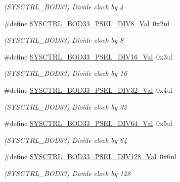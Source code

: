 \begin{DoxyCompactItemize}
\begin{DoxyCompactList}\small\item\em (S\+Y\+S\+C\+T\+R\+L\+\_\+\+B\+O\+D33) Divide clock by 4 \end{DoxyCompactList}\item 
\#define \mbox{\hyperlink{group___s_a_m_d21___s_y_s_c_t_r_l_gaa1ad5b1483db3f43c7c342ea50967e37}{S\+Y\+S\+C\+T\+R\+L\+\_\+\+B\+O\+D33\+\_\+\+P\+S\+E\+L\+\_\+\+D\+I\+V8\+\_\+\+Val}}~0x2ul
\begin{DoxyCompactList}\small\item\em (S\+Y\+S\+C\+T\+R\+L\+\_\+\+B\+O\+D33) Divide clock by 8 \end{DoxyCompactList}\item 
\#define \mbox{\hyperlink{group___s_a_m_d21___s_y_s_c_t_r_l_ga0711ef0d5c885afcd4cce3fd7d293f1e}{S\+Y\+S\+C\+T\+R\+L\+\_\+\+B\+O\+D33\+\_\+\+P\+S\+E\+L\+\_\+\+D\+I\+V16\+\_\+\+Val}}~0x3ul
\begin{DoxyCompactList}\small\item\em (S\+Y\+S\+C\+T\+R\+L\+\_\+\+B\+O\+D33) Divide clock by 16 \end{DoxyCompactList}\item 
\#define \mbox{\hyperlink{group___s_a_m_d21___s_y_s_c_t_r_l_ga701104d5ed696bb56d1e85da44ccce69}{S\+Y\+S\+C\+T\+R\+L\+\_\+\+B\+O\+D33\+\_\+\+P\+S\+E\+L\+\_\+\+D\+I\+V32\+\_\+\+Val}}~0x4ul
\begin{DoxyCompactList}\small\item\em (S\+Y\+S\+C\+T\+R\+L\+\_\+\+B\+O\+D33) Divide clock by 32 \end{DoxyCompactList}\item 
\#define \mbox{\hyperlink{group___s_a_m_d21___s_y_s_c_t_r_l_ga5757a50e16875f64f1c8b9bd75e353b1}{S\+Y\+S\+C\+T\+R\+L\+\_\+\+B\+O\+D33\+\_\+\+P\+S\+E\+L\+\_\+\+D\+I\+V64\+\_\+\+Val}}~0x5ul
\begin{DoxyCompactList}\small\item\em (S\+Y\+S\+C\+T\+R\+L\+\_\+\+B\+O\+D33) Divide clock by 64 \end{DoxyCompactList}\item 
\#define \mbox{\hyperlink{group___s_a_m_d21___s_y_s_c_t_r_l_gaadd052e98a1f4ee3b8ba37de993ab747}{S\+Y\+S\+C\+T\+R\+L\+\_\+\+B\+O\+D33\+\_\+\+P\+S\+E\+L\+\_\+\+D\+I\+V128\+\_\+\+Val}}~0x6ul
\begin{DoxyCompactList}\small\item\em (S\+Y\+S\+C\+T\+R\+L\+\_\+\+B\+O\+D33) Divide clock by 128 \end{DoxyCompactList}\item 

\end{DoxyCompactItemize}
